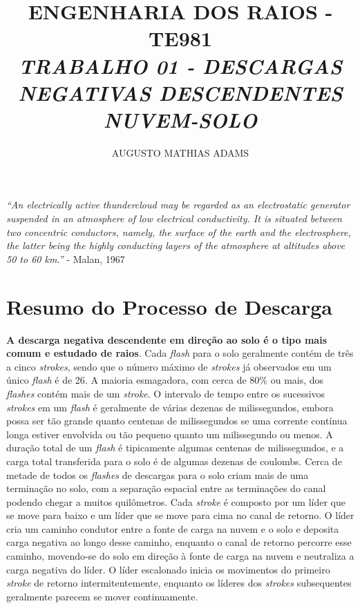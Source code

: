 \documentclass[a4paper, 12pt, onecolumn,singlespacing]{article}
\title{\normalsize{ENGENHARIA DOS RAIOS - TE981}\\ \huge{\textbf\textit{{TRABALHO 01 - DESCARGAS NEGATIVAS DESCENDENTES NUVEM-SOLO}}\\}}
\author{\small{AUGUSTO MATHIAS ADAMS}}
\begin{document}
	
	\maketitle

	\textit{``An electrically active thundercloud may be regarded as an
	electrostatic generator suspended in an atmosphere of low
	electrical conductivity. It is situated between two concentric
	conductors, namely, the surface of the earth and the
	electrosphere, the latter being the highly conducting layers of the
	atmosphere at altitudes above 50 to 60 km.''} - Malan, 1967

	\section{Resumo do Processo de Descarga}
	
	\textbf{A descarga negativa descendente em direção ao solo é o tipo mais comum e estudado de raios}. Cada \textit{flash} para o solo geralmente contém de três a cinco \textit{strokes}, sendo que o número máximo de \textit{strokes} já observados em um único \textit{flash} é de 26. A maioria esmagadora, com cerca de 80\% ou mais, dos \textit{flashes} contém mais de um \textit{stroke}. O intervalo de tempo entre os sucessivos \textit{strokes} em um \textit{flash} é geralmente de várias dezenas de milissegundos, embora possa ser tão grande quanto centenas de milissegundos se uma corrente contínua longa estiver envolvida ou tão pequeno quanto um milissegundo ou menos. A duração total de um \textit{flash} é tipicamente algumas centenas de milissegundos, e a carga total transferida para o solo é de algumas dezenas de coulombs. Cerca de metade de todos os \textit{flashes} de descargas para o solo criam mais de uma terminação no solo, com a separação espacial entre as terminações do canal podendo chegar a muitos quilômetros. Cada \textit{stroke} é composto por um líder que se move para baixo e um líder que se move para cima no canal de retorno. O líder cria um caminho condutor entre a fonte de carga na nuvem e o solo e deposita carga negativa ao longo desse caminho, enquanto o canal de retorno percorre esse caminho, movendo-se do solo em direção à fonte de carga na nuvem e neutraliza a carga negativa do líder. O líder escalonado inicia os movimentos do primeiro \textit{stroke} de retorno intermitentemente, enquanto os líderes dos \textit{strokes} subsequentes geralmente parecem se mover continuamente\cite{RAKOV_UHMAN}.
	
\end{document}
